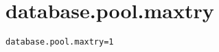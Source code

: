 \section{database.pool.maxtry}
\label{configuration:DatabasePoolMaxtry}
\AvailableInJavaOnly{\TODO}
\begin{lstlisting}[style=Props,caption={Usage example for \textit{database.pool.maxtry}}]
database.pool.maxtry=1
\end{lstlisting}